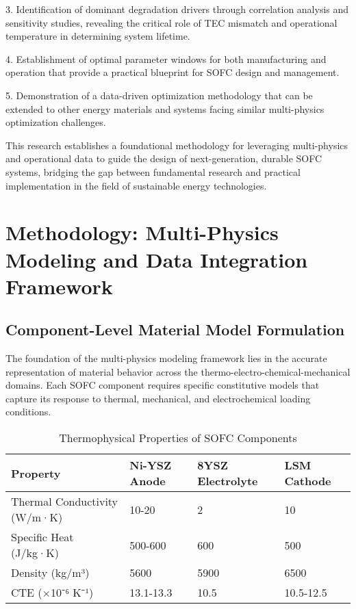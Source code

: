 \documentclass[10pt,conference]{IEEEtran}
\begin{document}
3. Identification of dominant degradation drivers through correlation analysis and sensitivity studies, revealing the critical role of TEC mismatch and operational temperature in determining system lifetime.

4. Establishment of optimal parameter windows for both manufacturing and operation that provide a practical blueprint for SOFC design and management.

5. Demonstration of a data-driven optimization methodology that can be extended to other energy materials and systems facing similar multi-physics optimization challenges.

This research establishes a foundational methodology for leveraging multi-physics and operational data to guide the design of next-generation, durable SOFC systems, bridging the gap between fundamental research and practical implementation in the field of sustainable energy technologies.

\section{Methodology: Multi-Physics Modeling and Data Integration Framework}

\subsection{Component-Level Material Model Formulation}

The foundation of the multi-physics modeling framework lies in the accurate representation of material behavior across the thermo-electro-chemical-mechanical domains. Each SOFC component requires specific constitutive models that capture its response to thermal, mechanical, and electrochemical loading conditions.

\begin{table}[H]
\centering
\caption{Thermophysical Properties of SOFC Components}
\label{tab:thermophysical}
\begin{tabular}{@{}llll@{}}
\toprule
Property & Ni-YSZ Anode & 8YSZ Electrolyte & LSM Cathode \\
\midrule
Thermal Conductivity (W/m·K) & 10-20 & 2 & 10 \\
Specific Heat (J/kg·K) & 500-600 & 600 & 500 \\
Density (kg/m³) & 5600 & 5900 & 6500 \\
CTE (×10⁻⁶ K⁻¹) & 13.1-13.3 & 10.5 & 10.5-12.5 \\
\bottomrule
\end{tabular}
\end{table}
\end{document}
